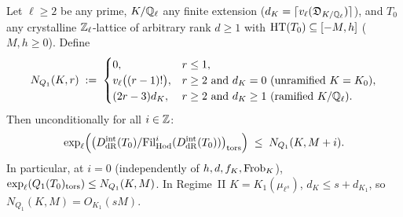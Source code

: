 \begin{theorem}\label{thm:2:pd}
\tagProved{}
Let $\ell \ge 2$ be any prime, $K/\mathbb{Q}_\ell$ any finite extension ($d_K = \lceil v_\ell(\mathfrak{D}_{K/\mathbb{Q}_\ell}) \rceil$), and $T_0$ any crystalline $\mathbb{Z}_\ell$-lattice of arbitrary rank $d \ge 1$ with $\mathrm{HT}(T_0) \subseteq [-M, h]$ ($M, h \ge 0$). Define
\begin{equation}\label{eq:2:NQ1}
  N_{Q_1}(K, r) \;:=\; \begin{cases}
    0, & r \le 1,\\
    v_\ell\bigl((r - 1)!\bigr), & r \ge 2 \text{ and } d_K = 0 \text{ (unramified } K = K_0\text{)},\\
    (2r - 3) d_K, & r \ge 2 \text{ and } d_K \ge 1 \text{ (ramified } K/\mathbb{Q}_\ell\text{)}.
  \end{cases}
\end{equation}
Then unconditionally for all $i \in \mathbb{Z}$:
\begin{equation}\label{eq:2:Q1bound}
  \exp_\ell\Bigl(\bigl(D_{\mathrm{dR}}^{\mathrm{int}}(T_0) / \mathrm{Fil}^i_{\mathrm{Hod}}(D_{\mathrm{dR}}^{\mathrm{int}}(T_0))\bigr)_{\mathrm{tors}}\Bigr) \;\le\; N_{Q_1}(K, M + i).
\end{equation}
In particular, at $i = 0$ (independently of $h, d, f_K, \mathrm{Frob}_K$), $\exp_\ell(Q_1(T_0)_{\mathrm{tors}}) \le N_{Q_1}(K, M)$. In Regime~II $K = K_1(\mu_{\ell^s})$, $d_K \le s + d_{K_1}$, so $N_{Q_1}(K, M) = O_{K_1}(sM)$.
\end{theorem}

